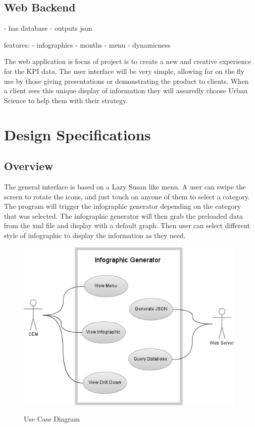 \documentclass[11pt,a4paper,oneside]{article}
\begin{document}
\subsection {Web Backend}
 - has database
 - outputs json



features: 
   - infographics
   - months
   - menu
   - dynamicness


The web application is focus of project is to create a new and creative experience for the KPI data. The user interface will be very simple, allowing for on the fly use by those giving presentations or demonstrating the product to clients. When a client sees this unique display of information they will assuredly choose Urban Science to help them with their strategy.\\




\section{Design Specifications}

\subsection{Overview}

The general interface is based on a Lazy Susan like menu. A user can swipe the screen to rotate the icons, and just touch on anyone of them to select a category. The program will trigger the infographic generator depending on the category that was selected. The infographic generator will then grab the preloaded data from the xml file and display with a default graph. Then user can select different style of infographic to display the information as they need.\\

\begin{figure}[!]
\caption{Use Case Diagram}
\includegraphics[width=1\textwidth]{images/Capstone_-_Use_Case_Diagram.png}\\   
\end{figure}
\end{document}
